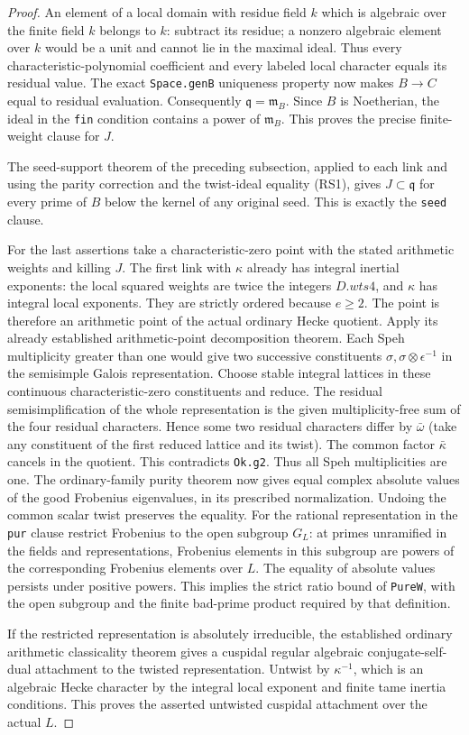 \begin{proof}
An element of a local domain with residue field $k$ which
is algebraic over the finite field $k$ belongs to $k$:
subtract its residue; a nonzero algebraic element over $k$
would be a unit and cannot lie in the maximal ideal.
Thus every characteristic-polynomial coefficient and every
labeled local character equals its residual value.
The exact \texttt{Space.genB} uniqueness property now
makes $B\to C$ equal to residual evaluation. Consequently
$\mathfrak q=\mathfrak m_B$. Since $B$ is Noetherian,
the ideal in the \texttt{fin} condition contains a power
of $\mathfrak m_B$. This proves the precise finite-weight
clause for $J$.

The seed-support theorem of the preceding subsection,
applied to each link and using the parity correction and
the twist-ideal equality (RS1), gives $J\subset\mathfrak q$
for every prime of $B$ below the kernel of any original
seed. This is exactly the \texttt{seed} clause.

For the last assertions take a characteristic-zero point
with the stated arithmetic weights and killing $J$.
The first link with $\kappa$ already has integral inertial
exponents: the local squared weights are twice the integers
$D.wts4$, and $\kappa$ has integral local exponents.
They are strictly ordered because $e\geq2$. The point is
therefore an arithmetic point of the actual ordinary
Hecke quotient. Apply its already established
arithmetic-point decomposition theorem. Each Speh
multiplicity greater than one would give two successive
constituents $\sigma,\sigma\otimes\epsilon^{-1}$ in the
semisimple Galois representation. Choose stable integral
lattices in these continuous characteristic-zero
constituents and reduce. The residual semisimplification
of the whole representation is the given multiplicity-free
sum of the four residual characters. Hence some two
residual characters differ by $\bar\omega$ (take any
constituent of the first reduced lattice and its twist).
The common factor $\bar\kappa$ cancels in the quotient.
This contradicts \texttt{Ok.g2}. Thus all Speh
multiplicities are one. The ordinary-family purity theorem
now gives equal complex absolute values of the good
Frobenius eigenvalues, in its prescribed normalization.
Undoing the common scalar twist preserves the equality.
For the rational representation in the \texttt{pur} clause
restrict Frobenius to the open subgroup $G_L$:
at primes unramified in the fields and representations,
Frobenius elements in this subgroup are powers of the
corresponding Frobenius elements over $L$. The equality of
absolute values persists under positive powers. This
implies the strict ratio bound of \texttt{PureW}, with
the open subgroup and the finite bad-prime product
required by that definition.

If the restricted representation is absolutely irreducible,
the established ordinary arithmetic classicality theorem
gives a cuspidal regular algebraic conjugate-self-dual
attachment to the twisted representation. Untwist by
$\kappa^{-1}$, which is an algebraic Hecke character by
the integral local exponent and finite tame inertia
conditions. This proves the asserted untwisted
cuspidal attachment over the actual $L$.
\end{proof}

